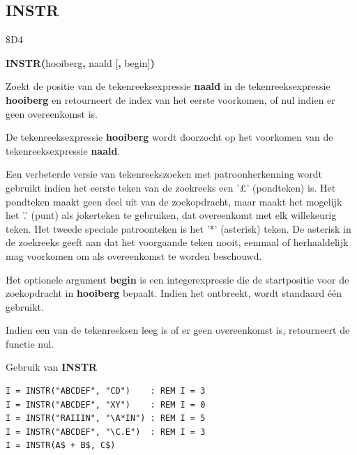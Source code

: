 \subsection{INSTR}
\begin{description}[leftmargin=2cm,style=nextline]
\item [Token:]    \$D4

\item [Formaat:]   {\bf INSTR(}hooiberg{\bf,} naald [{\bf,} begin]{\bf)}

\item [Gebruik:]    Zoekt de positie van de tekenreeksexpressie {\bf naald} in de tekenreeksexpressie {\bf hooiberg} en retourneert de index van het eerste voorkomen, of nul indien er geen overeenkomst is.

                  De tekenreeksexpressie {\bf hooiberg} wordt doorzocht op het voorkomen van de tekenreeksexpressie {\bf naald}.

Een verbeterde versie van tekenreekszoeken met patroonherkenning wordt gebruikt indien het eerste teken van de zoekreeks een '£' (pondteken) is. Het pondteken maakt geen deel uit van de zoekopdracht, maar maakt het mogelijk het '.' (punt) als jokerteken te gebruiken, dat overeenkomt met elk willekeurig teken. Het tweede speciale patroonteken is het '*' (asterisk) teken. De asterisk in de zoekreeks geeft aan dat het voorgaande teken nooit, eenmaal of herhaaldelijk mag voorkomen om als overeenkomst te worden beschouwd.

                  Het optionele argument {\bf begin} is een integerexpressie die de startpositie voor de zoekopdracht in {\bf hooiberg} bepaalt. Indien het ontbreekt, wordt standaard één gebruikt.

\item [Opmerkingen:]  Indien een van de tekenreeksen leeg is of er geen overeenkomst is, retourneert de functie nul.

\item [Voorbeelden:] Gebruik van {\bf INSTR}

\begin{tcolorbox}[colback=black,coltext=white]
\verbatimfont{\codefont}
\begin{verbatim}
I = INSTR("ABCDEF", "CD")    : REM I = 3
I = INSTR("ABCDEF", "XY")    : REM I = 0
I = INSTR("RAIIIN", "\A*IN") : REM I = 5
I = INSTR("ABCDEF", "\C.E")  : REM I = 3
I = INSTR(A$ + B$, C$)
\end{verbatim}
\end{tcolorbox}
\end{description}

